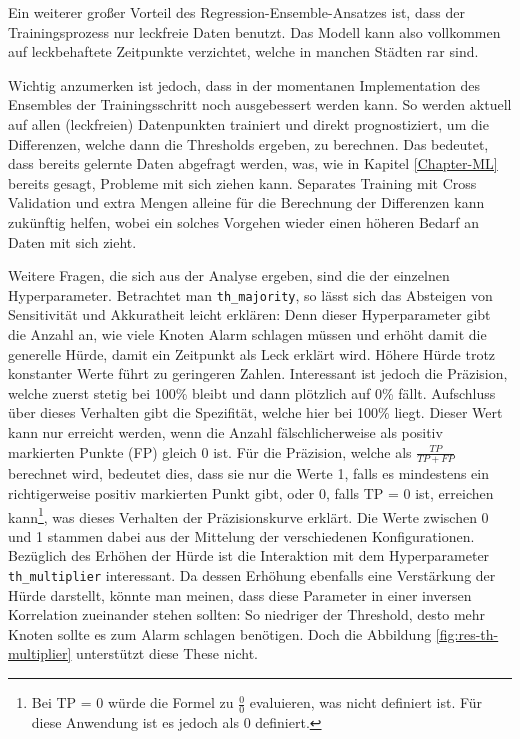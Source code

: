 Ein weiterer großer Vorteil des Regression-Ensemble-Ansatzes ist, dass der Trainingsprozess nur leckfreie Daten
 benutzt. Das Modell kann also vollkommen auf leckbehaftete Zeitpunkte verzichtet, welche in manchen Städten rar
 sind.

Wichtig anzumerken ist jedoch, dass in der momentanen Implementation des Ensembles der Trainingsschritt noch
 ausgebessert werden kann. So werden aktuell auf allen (leckfreien) Datenpunkten trainiert und direkt
 prognostiziert, um die Differenzen, welche dann die Thresholds ergeben, zu berechnen. Das bedeutet, dass
 bereits gelernte Daten abgefragt werden, was, wie in Kapitel \ref{Chapter-ML} bereits gesagt, Probleme mit
 sich ziehen kann. Separates Training mit Cross Validation und extra Mengen alleine für die Berechnung der
 Differenzen kann zukünftig helfen, wobei ein solches Vorgehen wieder einen höheren Bedarf an Daten mit sich zieht.

Weitere Fragen, die sich aus der Analyse ergeben, sind die der einzelnen Hyperparameter. Betrachtet man
 \texttt{th\_majority}, so lässt sich das Absteigen von Sensitivität und Akkuratheit leicht erklären: Denn dieser
 Hyperparameter gibt die Anzahl an, wie viele Knoten Alarm schlagen müssen und erhöht damit die generelle Hürde,
 damit ein Zeitpunkt als Leck erklärt wird. Höhere Hürde trotz konstanter Werte führt zu geringeren Zahlen.
 Interessant ist jedoch die Präzision, welche zuerst stetig bei 100\% bleibt und dann plötzlich auf 0\%
 fällt. Aufschluss über dieses Verhalten gibt die Spezifität, welche hier bei 100\% liegt. Dieser Wert kann
 nur erreicht werden, wenn die Anzahl fälschlicherweise als positiv markierten Punkte (FP) gleich 0 ist.
 Für die Präzision, welche als $\frac{TP}{TP+FP}$ berechnet wird, bedeutet dies, dass sie nur die Werte 1, falls
 es mindestens ein richtigerweise positiv markierten Punkt gibt, oder 0, falls TP = 0 ist, erreichen
 kann\footnote{Bei TP = 0 würde die Formel zu $\frac{0}{0}$ evaluieren, was nicht definiert ist. Für diese Anwendung
 ist es jedoch als 0 definiert.}, was dieses Verhalten der Präzisionskurve erklärt. Die Werte zwischen 0 und 1
 stammen dabei aus der Mittelung der verschiedenen Konfigurationen. Bezüglich des Erhöhen der Hürde ist die
 Interaktion mit dem Hyperparameter \texttt{th\_multiplier} interessant. Da dessen Erhöhung ebenfalls eine
 Verstärkung der Hürde darstellt, könnte man meinen, dass diese Parameter in einer inversen Korrelation
 zueinander stehen sollten: So niedriger der Threshold, desto mehr Knoten sollte es zum Alarm schlagen
 benötigen. Doch die Abbildung \ref{fig:res-th-multiplier} unterstützt diese These nicht.

